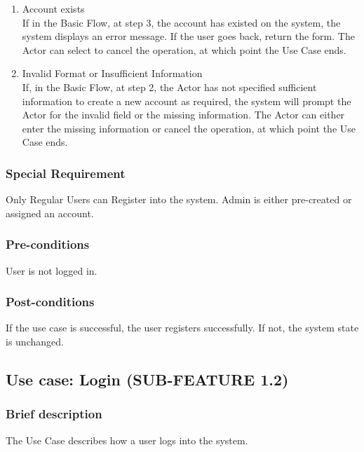 \begin{enumerate}[label=(\roman*)]
    \item Account exists \\
If in the Basic Flow, at step 3, the account has existed on the system, the system displays an error message. If the user goes back, return the form. The Actor can select to cancel the operation, at which point the Use Case ends.
    \item Invalid Format or Insufficient Information \\
If, in the Basic Flow, at step 2, the Actor has not specified sufficient information to create a new account as required, the system will prompt the Actor for the invalid field or the missing information. The Actor can either enter the missing information or cancel the operation, at which point the Use Case ends.
\end{enumerate}

\subsubsection{Special Requirement}
Only Regular Users can Register into the system. Admin is either pre-created or assigned an account. 
\subsubsection{Pre-conditions}
User is not logged in.
\subsubsection{Post-conditions}
If the use case is successful, the user registers successfully. If not, the system state is unchanged.

\subsection{Use case: Login (SUB-FEATURE 1.2)}
\subsubsection{Brief description}
The Use Case describes how a user logs into the system.
